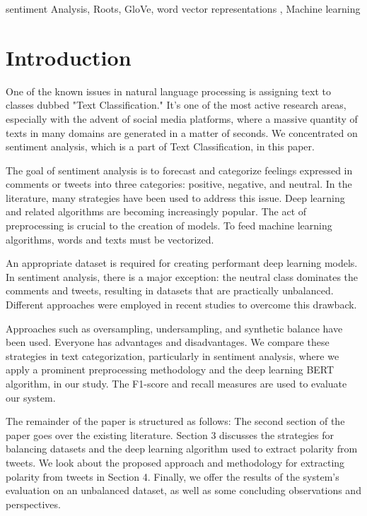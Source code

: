 \documentclass[conference]{IEEEtran}
\begin{document}
	\begin{abstract}
		
	\end{abstract}
	
	\begin{IEEEkeywords}
		sentiment Analysis, Roots, GloVe, word vector representations , Machine learning
	\end{IEEEkeywords}
	
	\section{Introduction}
	One of the known issues in natural language processing is assigning text to classes dubbed "Text Classification."
	It's one of the most active research areas, especially with the advent of social media platforms, where a massive quantity of texts in many domains are generated in a matter of seconds.
	We concentrated on sentiment analysis, which is a part of Text Classification, in this paper. 
	
	The goal of sentiment analysis is to forecast and categorize feelings expressed in comments or tweets into three categories: positive, negative, and neutral. In the literature, many strategies have been used to address this issue. Deep learning and related algorithms are becoming increasingly popular. The act of preprocessing is crucial to the creation of models. To feed machine learning algorithms, words and texts must be vectorized.
	
	An appropriate dataset is required for creating performant deep learning models. In sentiment analysis, there is a major exception: the neutral class dominates the comments and tweets, resulting in datasets that are practically unbalanced. Different approaches were employed in recent studies to overcome this drawback. 
	
	Approaches such as oversampling, undersampling, and synthetic balance have been used. Everyone has advantages and disadvantages. We compare these strategies in text categorization, particularly in sentiment analysis, where we apply a prominent preprocessing methodology and the deep learning BERT algorithm, in our study. The F1-score and recall measures are used to evaluate our system. 
	
	The remainder of the paper is structured as follows:
	The second section of the paper goes over the existing literature.
	Section 3 discusses the strategies for balancing datasets and the deep learning algorithm used to extract polarity from tweets.
	We look about the proposed approach and methodology for extracting polarity from tweets in Section 4.
	Finally, we offer the results of the system's evaluation on an unbalanced dataset, as well as some concluding observations and perspectives. 
	
\end{document}
